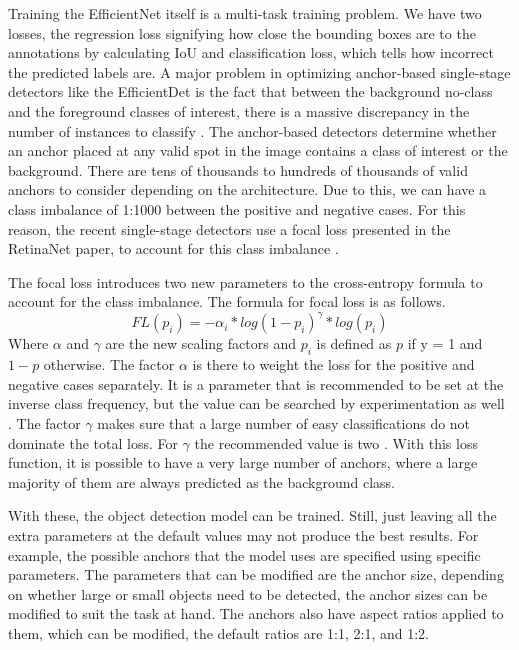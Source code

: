 Training the EfficientNet itself is a multi-task training problem. 
We have two losses, the regression loss signifying how close the bounding boxes are to the annotations by calculating IoU and classification loss, which tells how incorrect the predicted labels are.
A major problem in optimizing anchor-based single-stage detectors like the EfficientDet is the fact that between the background no-class and the foreground classes of interest, there is a massive discrepancy in the number of instances to classify \citep{retinaNet}.
The anchor-based detectors determine whether an anchor placed at any valid spot in the image contains a class of interest or the background. 
There are tens of thousands to hundreds of thousands of valid anchors to consider depending on the architecture. 
Due to this, we can have a class imbalance of 1:1000 between the positive and negative cases.
For this reason, the recent single-stage detectors use a focal loss presented in the RetinaNet paper, to account for this class imbalance \citep{retinaNet}.

The focal loss introduces two new parameters to the cross-entropy formula to account for the class imbalance. 
The formula for focal loss is as follows.
\[FL(p_i) = -\alpha_i * log(1-p_i)^\gamma * log(p_i)\] \noindent
Where $\alpha$ and $\gamma$ are the new scaling factors and $p_i$ is defined as $p$ if y = 1 and $1 - p$ otherwise.
The factor $\alpha$ is there to weight the loss for the positive and negative cases separately. 
It is a parameter that is recommended to be set at the inverse class frequency, but the value can be searched by experimentation as well \citep{retinaNet}.
The factor $\gamma$ makes sure that a large number of easy classifications do not dominate the total loss.
For $\gamma$ the recommended value is two \citep{retinaNet}.
With this loss function, it is possible to have a very large number of anchors, where a large majority of them are always predicted as the background class.

With these, the object detection model can be trained.
Still, just leaving all the extra parameters at the default values may not produce the best results.
For example, the possible anchors that the model uses are specified using specific parameters.
The parameters that can be modified are the anchor size, depending on whether large or small objects need to be detected, the anchor sizes can be modified to suit the task at hand.
The anchors also have aspect ratios applied to them, which can be modified, the default ratios are 1:1, 2:1, and 1:2. 

